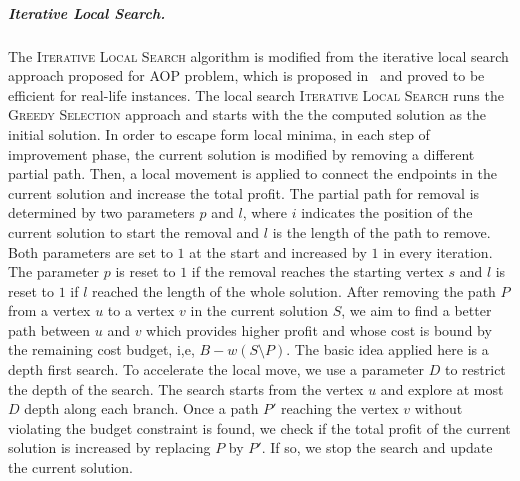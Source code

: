 \documentclass[sigconf,natbib=false]{acmart}
\newcommand{\greedy}{\textsc{Greedy Selection}\xspace}
\newcommand{\ils}{\textsc{Iterative Local Search}\xspace}
\newcommand{\AOP}{\textsc{AOP}\xspace}
\begin{document}
\subparagraph*{\textbf{Iterative Local Search.}}
The \ils algorithm is modified from the iterative local search approach proposed for \AOP problem, which is proposed in~\cite{} and proved to be efficient for real-life instances. 
The local search \ils runs the \greedy approach and starts with the the computed solution as the initial solution.
In order to escape form local minima, in each step of improvement phase, the current solution is modified by removing a different partial path. Then, a local movement is applied to connect the endpoints in the current solution and increase the total profit.
The partial path for removal is determined by two parameters $p$ and $l$, where $i$ indicates the position of the current solution to start the removal and $l$ is the length of the path to remove. 
Both parameters are set to $1$ at the start and increased by $1$ in every iteration. The parameter $p$ is reset to $1$ if the removal reaches the starting vertex $s$ and $l$ is reset to $1$ if $l$ reached the length of the whole solution.     
After removing the path $P$ from a vertex $u$ to a vertex $v$ in the current solution $S$, we aim to find a better path between $u$ and $v$ which provides higher profit and whose cost is bound by the remaining cost budget, i,e, $B- w(S\setminus P)$.    
The basic idea applied here is a depth first search. To accelerate the local move, we use a parameter $D$ to restrict the depth of the search. The search starts from  the vertex $u$ and explore at most $D$ depth along each branch. Once a path $P'$ reaching the vertex $v$  without violating the budget constraint is found, we check if the total profit of the current solution is increased by replacing $P$ by $P'$. 
If so, we stop the search and update the current solution. 
  
 
\end{document}
